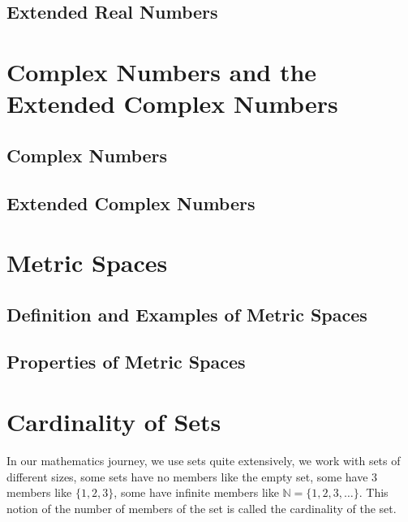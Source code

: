 \subsection{Extended Real Numbers}
\section{Complex Numbers and the Extended Complex Numbers}
\subsection{Complex Numbers}
\subsection{Extended Complex Numbers}
\section{Metric Spaces}
\subsection{Definition and Examples of Metric Spaces}
\subsection{Properties of Metric Spaces}
\section{Cardinality of Sets}
In our mathematics journey, we use sets quite extensively, we work with sets of different sizes, some sets have no members like the empty set, some have 3 members like $\{1,2,3\}$, some have infinite members like $\mathbb{N}=\{1,2,3,\dots\}$. This notion of the number of members of the set is called the cardinality of the set.
